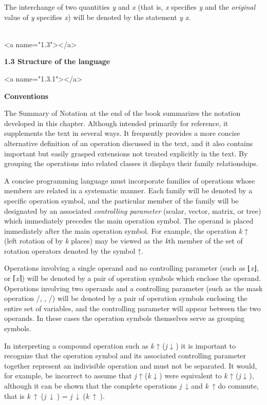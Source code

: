 \par The interchange of two quantities \textit{y} and \textit{x} (that is, \textit{x} specifies \textit{y} and the \textit{original} value of \textit{y} specifies \textit{x}) will be denoted by the statement \textit{y} \leftrightarrow \textit{x}.
\\\ 



<a name="1.3"></a>
\par \textbf{1.3 Structure of the language}

<a name="1.3.1"></a>
\par \textbf{Conventions}

\par The Summary of Notation at the end of the book summarizes the notation developed in this chapter. Although intended primarily for reference, it supplements the text in several ways. It frequently provides a more concise alternative definition of an operation discussed in the text, and it also contains important but easily grasped extensions not treated explicitly in the text. By grouping the operations into related classes it displays their family relationships.

\par A concise programming language must incorporate families of operations whose members are related in a systematic manner. Each family will be denoted by a specific operation symbol, and the particular member of the family will be designated by an associated
\textit{controlling parameter} (scalar, vector, matrix, or tree) which immediately precedes the main operation symbol. The operand is placed immediately after the main operation symbol. For example, the operation 
\textit{k} ↑  (left rotation of  by \textit{k} places) may be viewed as the \textit{k}th member of the set of rotation operators denoted by the symbol ↑.

\par Operations involving a single operand and no controlling parameter (such as 
⌊\textit{x}⌋, or 
⌈\textit{x}⌉) will be denoted by a pair of operation symbols which enclose the operand. Operations involving two operands and a controlling parameter (such as the mask operation 
/, , /) will be denoted by a pair of operation symbols enclosing the entire set of variables, and the controlling parameter will appear between the two operands. In these cases the operation symbols themselves serve as grouping symbols.

\par In interpreting a compound operation such as \textit{k} ↑ (\textit{j} ↓ ) it is important to recognize that the operation symbol and its associated controlling parameter together represent an indivisible operation and must not be separated. It would, for example, be incorrect to assume that
\textit{j} ↑ (\textit{k} ↓ ) were equivalent to 
\textit{k} ↑ (\textit{j} ↓ ), although it can be shown that the complete operations
\textit{j}\ ↓ and \textit{k}\ ↑ do commute, that is
\textit{k}\ ↑\ (\textit{j}\ ↓\ ) =
\textit{j}\ ↓\ (\textit{k}\ ↑\ ).

